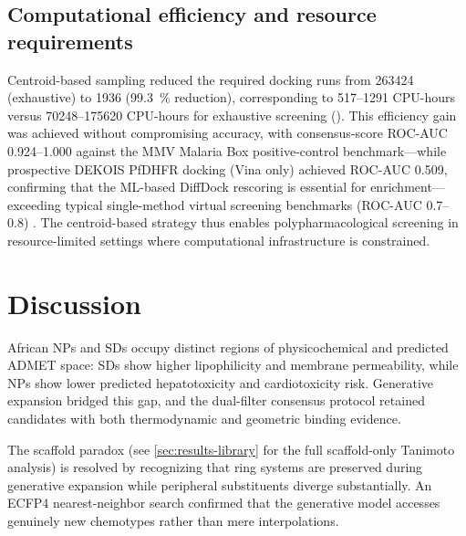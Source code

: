 \documentclass[journal=jcisd8,manuscript=article]{achemso}
\begin{document}
\subsection{Computational efficiency and resource requirements}
\label{sec:computational_efficiency}

Centroid-based sampling reduced the required docking runs from \num{263424} (exhaustive) to \num{1936} (\qty{99.3}{\percent} reduction), corresponding to \numrange{517}{1291} CPU-hours versus \numrange{70248}{175620} CPU-hours for exhaustive screening (). This efficiency gain was achieved without compromising accuracy, with consensus-score ROC-AUC \numrange{0.924}{1.000} against the MMV Malaria Box positive-control benchmark---while prospective DEKOIS PfDHFR docking (Vina only) achieved ROC-AUC \num{0.509}, confirming that the ML-based DiffDock rescoring is essential for enrichment---exceeding typical single-method virtual screening benchmarks (ROC-AUC \numrange{0.7}{0.8}) \cite{Truchon2007}. The centroid-based strategy thus enables polypharmacological screening in resource-limited settings where computational infrastructure is constrained.

\section{Discussion}

African NPs and SDs occupy distinct regions of physicochemical and predicted ADMET space: SDs show higher lipophilicity and membrane permeability, while NPs show lower predicted hepatotoxicity and cardiotoxicity risk. Generative expansion bridged this gap, and the dual-filter consensus protocol retained candidates with both thermodynamic and geometric binding evidence.

The scaffold paradox (see \cref{sec:results-library} for the full scaffold-only Tanimoto analysis) is resolved by recognizing that ring systems are preserved during generative expansion while peripheral substituents diverge substantially. An ECFP4 nearest-neighbor search confirmed that the generative model accesses genuinely new chemotypes rather than mere interpolations.
\end{document}
